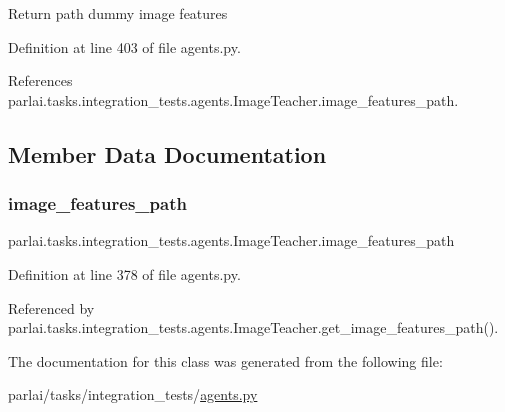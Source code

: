 \begin{DoxyVerb}Return path dummy image features\end{DoxyVerb}
 

Definition at line 403 of file agents.\+py.



References parlai.\+tasks.\+integration\+\_\+tests.\+agents.\+Image\+Teacher.\+image\+\_\+features\+\_\+path.



\subsection{Member Data Documentation}
\mbox{\label{classparlai_1_1tasks_1_1integration__tests_1_1agents_1_1ImageTeacher_a252433e0d09c09207362b031aa295696}} 
\subsubsection{\texorpdfstring{image\+\_\+features\+\_\+path}{image\_features\_path}}
{\footnotesize\ttfamily parlai.\+tasks.\+integration\+\_\+tests.\+agents.\+Image\+Teacher.\+image\+\_\+features\+\_\+path}



Definition at line 378 of file agents.\+py.



Referenced by parlai.\+tasks.\+integration\+\_\+tests.\+agents.\+Image\+Teacher.\+get\+\_\+image\+\_\+features\+\_\+path().



The documentation for this class was generated from the following file\+:\begin{DoxyCompactItemize}
\item 
parlai/tasks/integration\+\_\+tests/\hyperlink{parlai_2tasks_2integration__tests_2agents_8py}{agents.\+py}\end{DoxyCompactItemize}
